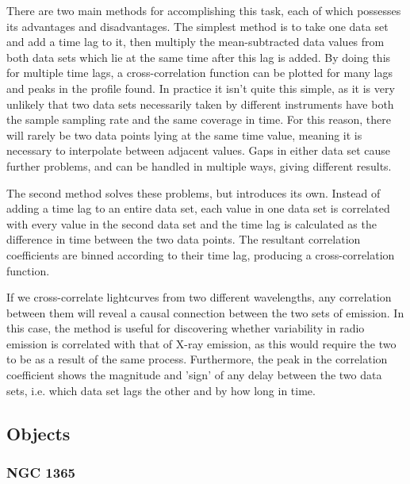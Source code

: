 \documentclass[letters,useAMS,usenatbib]{samnote}
\begin{document}
There are two main methods for accomplishing this task, each of which possesses its advantages and disadvantages. The simplest method is to take one data set and add a
time lag to it, then multiply the mean-subtracted data values from both data sets which lie at the same time after this lag is added. By doing this for multiple time
lags, a cross-correlation function can be plotted for many lags and peaks in the profile found. In practice it isn't quite this simple, as it is very unlikely that two
data sets necessarily taken by different instruments have both the sample sampling rate and the same coverage in time. For this reason, there will rarely be two data
points lying at the same time value, meaning it is necessary to interpolate between adjacent values. Gaps in either data set cause further problems, and can be handled in
multiple ways, giving different results.

The second method solves these problems, but introduces its own. Instead of adding a time lag to an entire data set, each value in one data set is correlated with every
value in the second data set and the time lag is calculated as the difference in time between the two data points. The resultant correlation coefficients are binned
according to their time lag, producing a cross-correlation function. 

If we cross-correlate lightcurves from two different wavelengths, any correlation between them will reveal a causal connection between the two sets of emission.  In this
case, the method is useful for discovering whether variability in radio emission is correlated with that of X-ray emission, as this would require the two to be as a
result of the same process. Furthermore, the peak in the correlation coefficient shows the magnitude and 'sign' of any delay between the two data sets, i.e. which data
set lags the other and by how long in time.

\subsection{Objects}

\subsubsection{NGC 1365}
\end{document}
